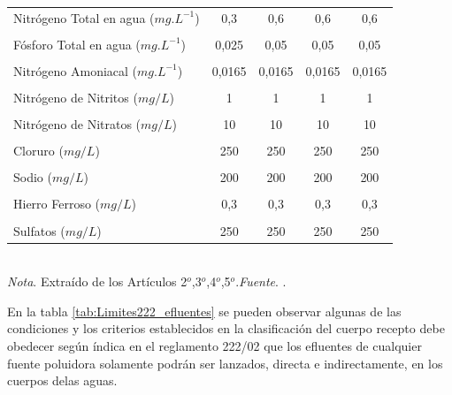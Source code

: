 \begin{table}[H]
\begin{tabular}{lcccc}
Nitr\'ogeno Total en agua ($mg.L^{-1}$) & 0,3       & 0,6        & 0,6        & 0,6        \\
                                        &           &            &            &            \\
F\'osforo Total en agua ($mg.L^{-1}$)   & 0,025     & 0,05       & 0,05       & 0,05       \\
                                        &           &            &            &            \\
Nitr\'ogeno Amoniacal ($mg.L^{-1}$)       & 0,0165    & 0,0165     & 0,0165     & 0,0165     \\
                                        &           &            &            &            \\
Nitr\'ogeno de Nitritos ($mg/L$)          & 1         & 1          & 1          & 1          \\
                                        &           &            &            &            \\
Nitr\'ogeno de Nitratos ($mg/L$)          & 10        & 10         & 10         & 10         \\
                                    &           &            &            &            \\ 
Cloruro ($mg /L$)                       & 250       & 250        & 250        & 250        \\
                                        &           &            &            &            \\
Sodio ($mg/L$)                          & 200       & 200        & 200        & 200        \\
                                        &           &            &            &            \\
Hierro Ferroso ($mg/L$)                 & 0,3       & 0,3        & 0,3        & 0,3        \\
                                        &           &            &            &            \\
Sulfatos ($mg/L$)                       & 250       & 250        & 250        & 250       \\
\bottomrule
\end{tabular}
\\
\bigskip
\small \textit{Nota}. Extra\'ido de los Art\'iculos 2$^{o}$,3$^{o}$,4$^{o}$,5$^{o}$.\textit{Fuente}. \cite{la-secretaria-del-ambiente-2002}.
\end{table}
En la tabla \ref{tab:Limites222_efluentes} se pueden observar algunas de las  condiciones y los criterios establecidos en la clasificaci\'on del cuerpo recepto debe obedecer seg\'un \'indica en el reglamento 222/02 que los efluentes de cualquier fuente poluidora solamente podr\'an ser lanzados, directa e indirectamente, en los cuerpos delas aguas.

